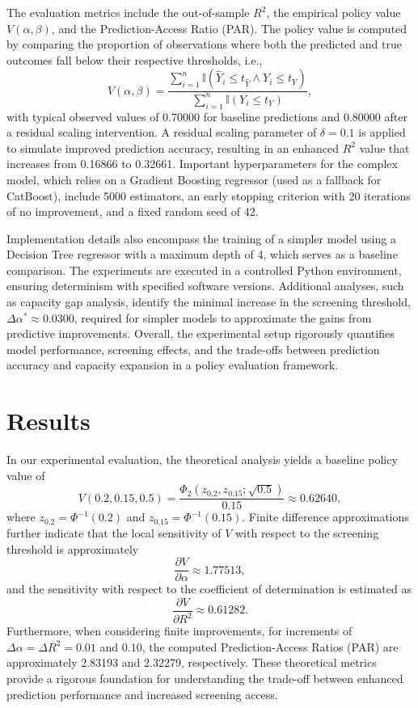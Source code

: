 \documentclass{article}
\begin{document}
The evaluation metrics include the out-of-sample \(R^2\), the empirical policy value \(V(\alpha,\beta)\), and the Prediction-Access Ratio (PAR). The policy value is computed by comparing the proportion of observations where both the predicted and true outcomes fall below their respective thresholds, i.e.,
\[
V(\alpha,\beta) = \frac{\sum_{i=1}^{n} \mathbb{I}(\hat{Y}_i \leq t_{\hat{Y}} \wedge Y_i \leq t_Y)}{\sum_{i=1}^{n} \mathbb{I}(Y_i \leq t_Y)},
\]
with typical observed values of 0.70000 for baseline predictions and 0.80000 after a residual scaling intervention. A residual scaling parameter of \(\delta = 0.1\) is applied to simulate improved prediction accuracy, resulting in an enhanced \(R^2\) value that increases from 0.16866 to 0.32661. Important hyperparameters for the complex model, which relies on a Gradient Boosting regressor (used as a fallback for CatBoost), include 5000 estimators, an early stopping criterion with 20 iterations of no improvement, and a fixed random seed of 42.

Implementation details also encompass the training of a simpler model using a Decision Tree regressor with a maximum depth of 4, which serves as a baseline comparison. The experiments are executed in a controlled Python environment, ensuring determinism with specified software versions. Additional analyses, such as capacity gap analysis, identify the minimal increase in the screening threshold, \(\Delta\alpha^* \approx 0.0300\), required for simpler models to approximate the gains from predictive improvements. Overall, the experimental setup rigorously quantifies model performance, screening effects, and the trade-offs between prediction accuracy and capacity expansion in a policy evaluation framework.

\section{Results}
In our experimental evaluation, the theoretical analysis yields a baseline policy value of 
\[
V(0.2,0.15,0.5)=\frac{\Phi_2(z_{0.2},z_{0.15};\sqrt{0.5})}{0.15} \approx 0.62640,
\]
where \(z_{0.2}=\Phi^{-1}(0.2)\) and \(z_{0.15}=\Phi^{-1}(0.15)\). Finite difference approximations further indicate that the local sensitivity of \(V\) with respect to the screening threshold is approximately 
\[
\frac{\partial V}{\partial \alpha}\approx1.77513,
\]
and the sensitivity with respect to the coefficient of determination is estimated as 
\[
\frac{\partial V}{\partial R^2}\approx0.61282.
\]
Furthermore, when considering finite improvements, for increments of \(\Delta\alpha=\Delta R^2=0.01\) and \(0.10\), the computed Prediction-Access Ratios (PAR) are approximately 2.83193 and 2.32279, respectively. These theoretical metrics provide a rigorous foundation for understanding the trade-off between enhanced prediction performance and increased screening access.
\end{document}
